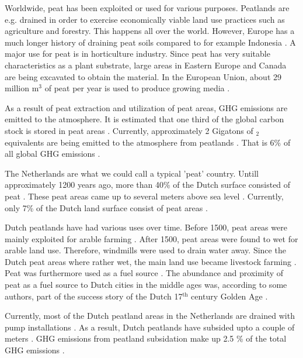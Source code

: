 \documentclass[a4paper,12pt]{scrbook}
\newcommand{\sur}[1]{\ensuremath{^{\textrm{#1}}}}
\newcommand{\sous}[1]{\ensuremath{_{\textrm{#1}}}}
\begin{document}
Worldwide, peat has been exploited or used for various purposes. Peatlands are e.g. drained in order to exercise economically viable land use practices such as agriculture and forestry. This happens all over the world. However, Europe has a much longer history of draining peat soils compared to for example Indonesia \citep{joosten2002wise}. A major use for peat is in horticulture industry. Since peat has very suitable characteristics as a plant substrate, large areas in Eastern Europe and Canada are being excavated to obtain the material. In the European Union, about 29 million m\sur{3} of peat per year is used to produce growing media \citep{blievernicht2012youngest}.

As a result of peat extraction and utilization of peat areas, \ac{GHG} emissions are emitted to the atmosphere. It is estimated that one third of the global carbon stock is stored in peat areas \citep{page2011global}. Currently, approximately 2 Gigatons of \sous{2} equivalents are being emitted to the atmosphere from peatlands \citep{joosten2009global}. That is 6\% of all global \ac{GHG} emissions \citep{joosten2012peatlands}.

The Netherlands are what we could call a typical 'peat' country. Untill approximately 1200 years ago, more than 40\% of the Dutch surface consisted of peat \citep{vos2015origin, de2008vergeten}. These peat areas came up to several meters above sea level \citep{de2008vergeten}. Currently, only 7\% of the Dutch land surface consist of peat areas \citep{de2004verbreiding}. 

Dutch peatlands have had various uses over time. Before 1500, peat areas were mainly exploited for arable farming \citep{ettema2005boeren}. After 1500, peat areas were found to wet for arable land use. Therefore, windmills were used to drain water away. Since the Dutch peat areas where rather wet, the main land use became livestock farming \citep{brouns2016effects}. Peat was furthermore used as a fuel source \citep{van1996turfwinning}. The abundance and proximity of peat as a fuel source to Dutch cities in the middle ages was, according to some authors, part of the success story of the Dutch 17\sur{th} century Golden Age \citep{dezeeuw}.

Currently, most of the Dutch peatland areas in the Netherlands are drained with pump installations \citep{brouns2016effects}. As a result, Dutch peatlands have subsided upto a couple of meters \citep{de2008vergeten}. \ac{GHG} emissions from peatland subsidation make up 2.5 \% of the total GHG emissions \citep{van2010emission}. 
\end{document}
